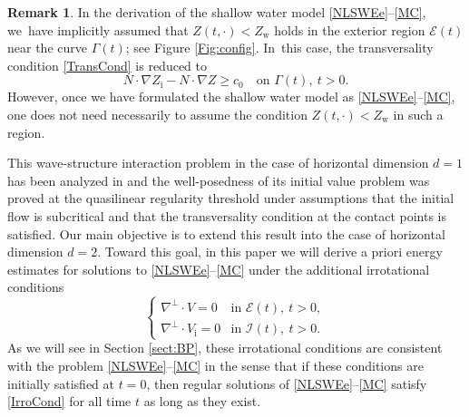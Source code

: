 \documentclass[11pt]{article}
\newcommand{\cI}{{\mathcal I}}
\newcommand{\cE}{{\mathcal E}}
\newcommand{\itGamma}{\mathit{\Gamma}}
\theoremstyle{definition}
\newtheorem{remark}[theorem]{Remark}
\begin{document}
\begin{remark}
In the derivation of the shallow water model \eqref{NLSWEe}--\eqref{MC}, we~have implicitly assumed that $Z(t,\cdot)<Z_\mathrm{w}$ holds in the exterior region
$\cE(t)$ near the curve $\itGamma(t)$; see Figure \ref{Fig:config}. In~this case, the transversality condition \eqref{TransCond} is reduced to
\[
N\cdot\nabla Z_\mathrm{i}-N\cdot\nabla Z \geq c_0 \quad\text{on } \itGamma(t), \ t>0.
\]
However, once we have formulated the shallow water model as \eqref{NLSWEe}--\eqref{MC},
one does not need necessarily to assume the condition $Z(t,\cdot)<Z_\mathrm{w}$ in such a region.
\end{remark}

This wave-structure interaction problem in the case of horizontal dimension $d=1$ has been analyzed in \cite{IguchiLannes2021} and
the well-posedness of its initial value problem was proved at the quasilinear regularity threshold under assumptions that
the initial flow is subcritical and that the transversality condition at the contact points is satisfied.
Our main objective is to extend this result into the case of horizontal dimension $d=2$.
Toward this goal, in this paper we will derive a priori energy estimates for solutions to \eqref{NLSWEe}--\eqref{MC} under the additional irrotational conditions
\begin{equation}\label{IrroCond}
\begin{cases}
\nabla^\perp\cdot V=0 &\text{in } \cE(t), \ t>0, \\
\nabla^\perp\cdot V_\mathrm{i}=0 &\text{in } \cI(t), \ t>0.
\end{cases}
\end{equation}
As we will see in Section \ref{sect:BP}, these irrotational conditions are consistent with the problem \eqref{NLSWEe}--\eqref{MC} in the sense that
if these conditions are initially satisfied at $t=0$, then regular solutions of \eqref{NLSWEe}--\eqref{MC} satisfy \eqref{IrroCond} for all time $t$
as long as they exist.
\end{document}
